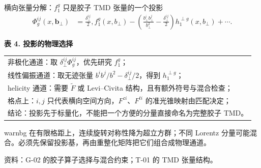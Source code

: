 \documentclass[UTF8,aspectratio=169,11pt]{ctexbeamer}
\newcommand{\source}[1]{%
  \par\vspace{-0.08em}%
  \noindent\parbox[t]{0.97\linewidth}{\raggedright\scriptsize\color{muted}资料：#1}\par}
\begin{document}
\begin{frame}[t]{横向张量分解：$f_1^g$ 只是胶子 TMD 张量的一个投影}
  \begin{align*}
    \Phi_g^{ij}(x,\boldsymbol b_\perp)
    &=\frac{\delta_\perp^{ij}}{2},f_1^g(x,b_\perp)
      -\left(\frac{b_\perp^i b_\perp^j}{b_\perp^2}
      -\frac{\delta_\perp^{ij}}{2}\right)
      h_1^{\perp g}(x,b_\perp)+\cdots .
  \end{align*}
  \begin{center}
  \textbf{表 4. 投影的物理选择}
  \vspace{0.12em}
  \begin{tabular}{@{}p{\linewidth}@{}}
    \toprule
    非极化通道：取 $\delta_\perp^{ij}\Phi_g^{ij}$，优先研究 $f_1^g$；\\
    线性偏振通道：取无迹张量 $b^i b^j/b^2-\delta_\perp^{ij}/2$，得到 $h_1^{\perp g}$；\\
    helicity 通道：需要 $\widetilde F$ 或 Levi--Civita 结构，且有额外符号与混合检查；\\
    格点上：$i,j$ 只代表横向空间方向，$F^{zi}$、$F^{ti}$ 的准光锥映射由匹配决定；\\
    结论：投影先于标量化，不能把一个方便的分量直接命名为完整胶子 TMD。\\
    \bottomrule
  \end{tabular}
  \end{center}
  \begin{beamercolorbox}[wd=0.96\textwidth,sep=0.45em,rounded=true]{warnbg}
    在有限格距上，连续旋转对称性降为超立方群；不同 Lorentz 分量可能混合。必须先保留投影基，再由重整化矩阵把它们组合成物理通道。
  \end{beamercolorbox}
  \source{G-02 的胶子算子选择与混合约束；T-01 的 TMD 张量结构。}
\end{frame}
\end{document}
